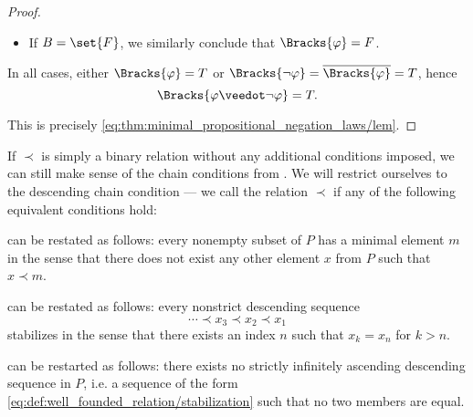 \begin{proof}
\begin{itemize}
\begin{itemize}
      \item If \( B = \set{ F } \), we similarly conclude that \( \Bracks{\varphi} = F \).
    \end{itemize}
  \end{itemize}

  In all cases, either \( \Bracks{\varphi} = T \) or \( \Bracks{\neg \varphi} = \oline{\Bracks{\varphi}} = T \), hence
  \begin{equation*}
    \Bracks{\varphi \synvee \neg \varphi} = T.
  \end{equation*}

  This is precisely \eqref{eq:thm:minimal_propositional_negation_laws/lem}.
\end{proof}

\begin{definition}\label{def:well_founded_relation}
  If \( \prec \) is simply a binary relation without any additional conditions imposed, we can still make sense of the chain conditions from . We will restrict ourselves to the descending chain condition --- we call the relation \( \prec \)  if any of the following equivalent conditions hold:

  \begin{thmenum}
      can be restated as follows: every nonempty subset of \( P \) has a minimal element \( m \) in the sense that there does not exist any other element \( x \) from \( P \) such that \( x \prec m \).

      can be restated as follows: every nonstrict descending sequence
    \begin{equation}\label{eq:def:well_founded_relation/stabilization}
      \cdots \prec x_3 \prec x_2 \prec x_1
    \end{equation}
    stabilizes in the sense that there exists an index \( n \) such that \( x_k = x_n \) for \( k > n \).

      can be restarted as follows: there exists no strictly infinitely ascending descending sequence in \( P \), i.e. a sequence of the form \eqref{eq:def:well_founded_relation/stabilization} such that no two members are equal.
  \end{thmenum}
\end{definition}

